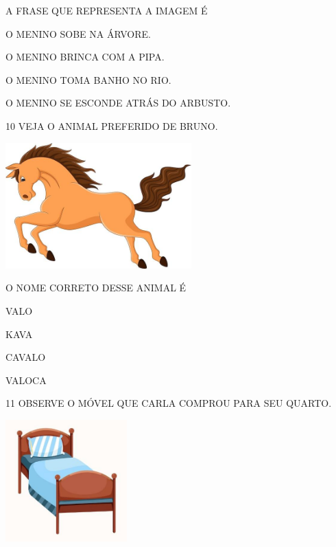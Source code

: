 A FRASE QUE REPRESENTA A IMAGEM É

\begin{escolha}
\item O MENINO SOBE NA ÁRVORE.

\item O MENINO BRINCA COM A PIPA.

\item O MENINO TOMA BANHO NO RIO.

\item O MENINO SE ESCONDE ATRÁS DO ARBUSTO.
\end{escolha}

\num{10} VEJA O ANIMAL PREFERIDO DE BRUNO.

\includegraphics[width=2.82210in,height=1.90975in]{media/image234.jpg}


O NOME CORRETO DESSE ANIMAL É

\begin{escolha}
\item VALO

\item KAVA

\item CAVALO

\item VALOCA
\end{escolha}

\num{11} OBSERVE O MÓVEL QUE CARLA COMPROU PARA SEU QUARTO.

\includegraphics[width=1.84783in,height=1.84783in]{media/image235.jpg}

